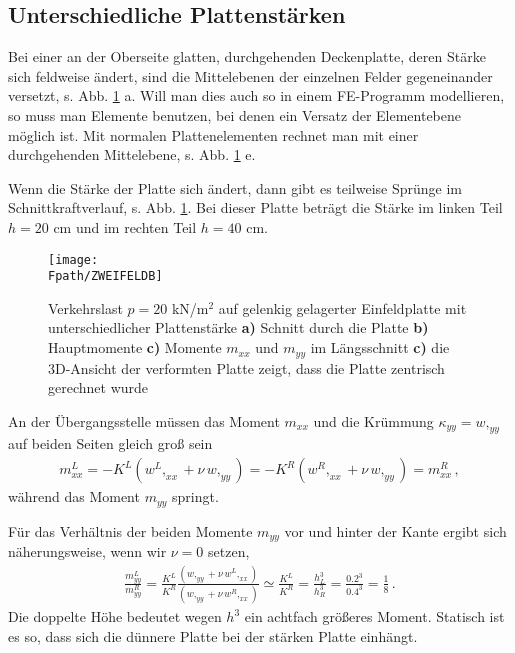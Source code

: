 {\textcolor{sectionTitleBlue}{\section{Unterschiedliche Plattenst\"{a}rken}}}
Bei einer an der Oberseite glatten, durchgehenden Deckenplatte, deren St\"{a}rke sich feldweise \"{a}ndert, sind die Mittelebenen der einzelnen Felder gegeneinander versetzt, s. Abb. \ref{Zweifeld} a. Will man dies auch so in einem FE-Programm modellieren, so muss man Elemente benutzen, bei denen ein Versatz der Elementebene m\"{o}glich ist. Mit normalen Plattenelementen rechnet man  mit einer durchgehenden Mittelebene, s. Abb. \ref{Zweifeld} e.

Wenn die St\"{a}rke der Platte sich \"{a}ndert, dann gibt es teilweise Spr\"{u}nge im Schnittkraftverlauf, s. Abb. \ref{Zweifeld}. Bei dieser Platte betr\"{a}gt die St\"{a}rke im linken Teil $h = 20$ cm und im rechten Teil $h = 40$ cm.
\begin{figure}[tbp]
\centering
\if {} \sidecaption \fi
\texttt{[image: \\Fpath/ZWEIFELDB]}
\caption{Verkehrslast $p = 20$ kN/m$^2$ auf gelenkig gelagerter Einfeldplatte mit
unterschiedlicher Plattenst\"{a}rke {\bf a)} Schnitt durch die Platte {\bf b)} Hauptmomente {\bf c)} Momente $m_{xx}$ und $m_{yy}$ im L\"{a}ngsschnitt {\bf c)} die 3D-Ansicht der verformten Platte zeigt, dass die Platte zentrisch gerechnet wurde}
\label{Zweifeld}
\end{figure}%

An der \"{U}bergangsstelle m\"{u}ssen das Moment $m_{xx}$ und die Kr\"{u}mmung $\kappa_{yy} = w,_{yy}$ auf beiden Seiten gleich gro{\ss} sein
\begin{align}
m_{xx}^L = - K^L(w^L,_{xx} + \nu\,w,_{yy}) = - K^R(w^R,_{xx} + \nu\,w,_{yy}) =
m_{xx}^R\,,
\end{align}
w\"{a}hrend das Moment $m_{yy}$ springt.

F\"{u}r das Verh\"{a}ltnis der beiden Momente $m_{yy}$ vor und hinter der Kante ergibt sich n\"{a}herungsweise, wenn wir $\nu = 0$ setzen,
\begin{align}
\frac{m_{yy}^L}{m_{yy}^R} = \frac{K^L}{K^R} \frac{(w,_{yy} + \nu\,w^L,_{xx})}{(w,_{yy} +
\nu\,w^R,_{xx})} \simeq \frac{K^L}{K^R} = \frac{h_L^3}{h_R^3} = \frac{0.2^3}{0.4^3} =
\frac{1}{8}\,.
\end{align}
Die doppelte H\"{o}he bedeutet wegen $h^3$ ein achtfach gr\"{o}{\ss}eres Moment. Statisch ist es so, dass sich die d\"{u}nnere Platte bei der st\"{a}rken Platte einh\"{a}ngt.

